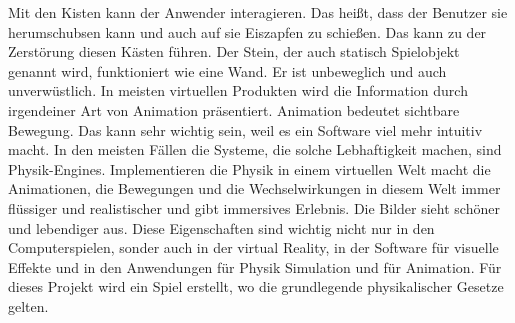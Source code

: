 \documentclass {article}
\begin{document}
\justify
Mit den Kisten kann der Anwender interagieren. Das heißt, dass der Benutzer sie herumschubsen kann und auch auf sie Eiszapfen zu schießen. Das kann zu der Zerstörung diesen Kästen führen. Der Stein, der auch statisch Spielobjekt genannt wird, funktioniert wie eine Wand. Er ist unbeweglich und auch unverwüstlich.
In meisten virtuellen Produkten wird die Information durch irgendeiner Art von Animation präsentiert. Animation bedeutet sichtbare Bewegung. Das kann sehr wichtig sein, weil es ein Software viel mehr intuitiv macht. In den meisten Fällen die Systeme, die solche Lebhaftigkeit machen, sind Physik-Engines.
Implementieren die Physik in einem virtuellen Welt macht die Animationen, die Bewegungen und die Wechselwirkungen in diesem Welt immer flüssiger und realistischer und gibt immersives Erlebnis. Die Bilder sieht schöner und lebendiger aus. Diese Eigenschaften sind wichtig nicht nur in den Computerspielen, sonder auch in der virtual Reality, in der Software für visuelle Effekte und in den Anwendungen für Physik Simulation und für Animation.
Für dieses Projekt wird ein Spiel erstellt, wo die grundlegende physikalischer Gesetze gelten.
\end{document}
